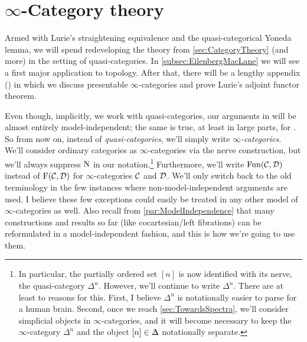 \section{\texorpdfstring{$\infty$}{Infinity}-Category theory}\label{sec:InftyCategoryTheory}

Armed with Lurie's straightening equivalence and the quasi-categorical Yoneda lemma, we will spend  redeveloping the theory from \cref{sec:CategoryTheory} (and more) in the setting of quasi-categories. In \cref{subsec:EilenbergMacLane} we will see a first major application to topology. After that, there will be a lengthy appendix () in which we discuss presentable $\infty$-categories and prove Lurie's adjoint functor theorem.

Even though, implicitly, we work with quasi-categories, our arguments in  will be almost entirely model-independent; the same is true, at least in large parts, for . So from now on, instead of \emph{quasi-categories}, we'll simply write \emph{$\infty$-categories}. We'll consider ordinary categories as $\infty$-categories via the nerve construction, but we'll always suppress $\operatorname{N}$ in our notation.\footnote{In particular, the partially ordered set $[n]$ is now identified with its nerve, the quasi-category $\Delta^n$. However, we'll continue to write $\Delta^n$. There are at least to reasons for this. First, I believe $\Delta^n$ is notationally easier to parse for a human brain. Second, once we reach \cref{sec:TowardsSpectra}, we'll consider simplicial objects in $\infty$-categories, and it will become necessary to keep the $\infty$-category $\Delta^n$ and the object $[n]\in\IDelta$ notationally separate.} Furthermore, we'll write $\operatorname{Fun}(\mathcal{C},\mathcal{D})$ instead of $\operatorname{F}(\mathcal{C},\mathcal{D})$ for $\infty$-categories $\mathcal{C}$ and $\mathcal{D}$. We'll only switch back to the old terminology in the few instances where non-model-independent arguments are used. I believe these few exceptions could easily be treated in any other model of $\infty$-categories as well. Also recall from \cref{par:ModelIndependence} that many constructions and results so far (like cocartesian/left fibrations) can be reformulated in a model-independent fashion, and this is how we're going to use them.
%
%

